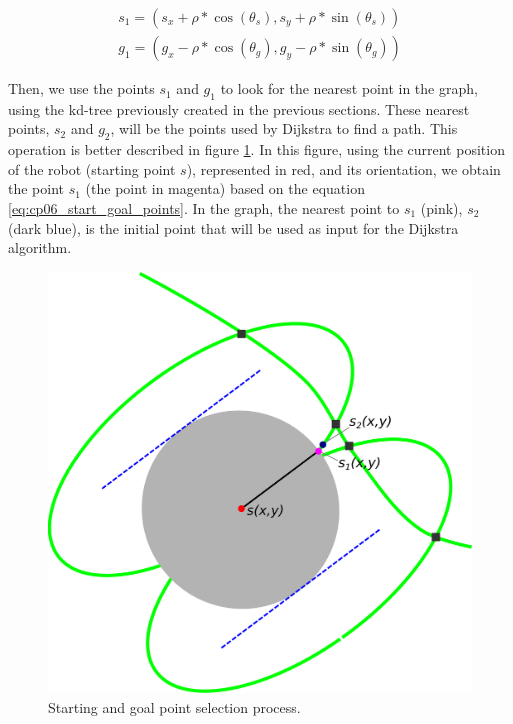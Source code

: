 \begin{equation}\label{eq:cp06_start_goal_points}
\begin {array}{l}
 s_1 = (s_x + \rho * \cos(\theta_s), s_y + \rho * \sin(\theta_s)) \\
 g_1 = (g_x - \rho * \cos(\theta_g), g_y - \rho * \sin(\theta_g))
\end{array}
\end{equation}

Then, we use the points $s_1$ and $g_1$ to look for the nearest point in the graph, using the kd-tree previously created in the previous sections. These nearest points, $s_2$ and $g_2$, will be the points used by Dijkstra to find a path. This operation is better described in figure \ref{fig:cp06_findstartgoal}. In this figure, using the current position of the robot (starting point $s$), represented in red, and its orientation, we obtain the point $s_1$ (the point in magenta) based on the equation \ref{eq:cp06_start_goal_points}. In the graph, the nearest point to $s_1$ (pink), $s_2$ (dark blue), is the initial point that will be used as input for the Dijkstra algorithm.

\begin{figure}[h!]
  \centering
  \includegraphics[width=\textwidth, trim=0 0 0 0,clip]{figure6}
  \caption{Starting and goal point selection process.}
  \label{fig:cp06_findstartgoal}
\end{figure}


